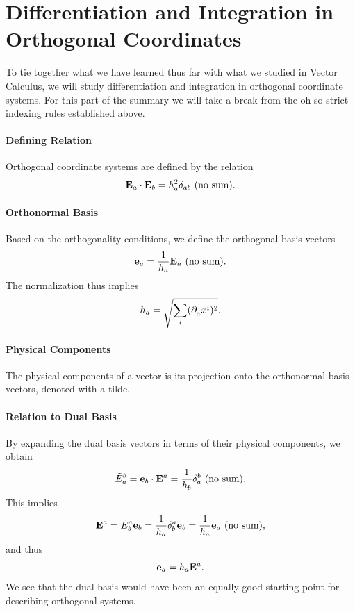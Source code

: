 \section{Differentiation and Integration in Orthogonal Coordinates}

To tie together what we have learned thus far with what we studied in Vector Calculus, we will study differentiation and integration in orthogonal coordinate systems. For this part of the summary we will take a break from the oh-so strict indexing rules established above.

\paragraph{Defining Relation}
Orthogonal coordinate systems are defined by the relation
\begin{align*}
	\vb{E}_{a}\cdot\vb{E}_{b} = h_{a}^{2}\delta_{ab}\ \text{(no sum)} .
\end{align*}

\paragraph{Orthonormal Basis}
Based on the orthogonality conditions, we define the orthogonal basis vectors
\begin{align*}
	\vb{e}_{a} = \frac{1}{h_{a}}\vb{E}_{a}\ \text{(no sum)} .
\end{align*}
The normalization thus implies
\begin{align*}
	h_{a} = \sqrt{\sum\limits_{i}(\partial^{}_{a}{x^{i}})^{2}}.
\end{align*}

\paragraph{Physical Components}
The physical components of a vector is its projection onto the orthonormal basis vectors, denoted with a tilde.

\paragraph{Relation to Dual Basis}
By expanding the dual basis vectors in terms of their physical components, we obtain
\begin{align*}
	\tilde{E}_{a}^{b} = \vb{e}_{b}\cdot\db{a} = \frac{1}{h_{b}}\kdelta{b}{a}\nosum .
\end{align*}
This implies
\begin{align*}
	\db{a} = \tilde{E}_{b}^{a}\vb{e}_{b} = \frac{1}{h_{a}}\kdelta{a}{b}\vb{e}_{b} = \frac{1}{h_{a}}\vb{e}_{a}\nosum ,
\end{align*}
and thus
\begin{align*}
	\vb{e}_{a} = h_{a}\vb{E}^{a}.
\end{align*}
We see that the dual basis would have been an equally good starting point for describing orthogonal systems.

